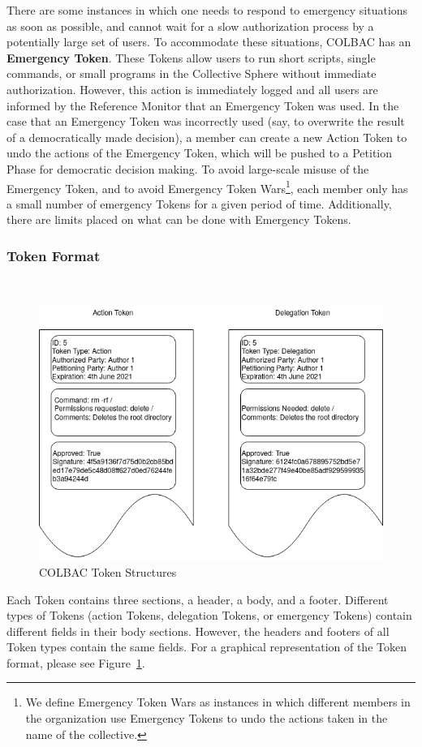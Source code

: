 There are some instances in which one needs to respond to emergency situations
as soon as possible, and cannot wait for a slow authorization process by a
potentially large set of users. To accommodate these situations, COLBAC has an
\textbf{Emergency Token}. These Tokens allow users to run short scripts, single
commands, or small programs in the Collective Sphere without immediate
authorization. However, this action is immediately logged and all users are
informed by the Reference Monitor that an Emergency Token was used. In the case
that an Emergency Token was incorrectly used (say, to overwrite the result of
a democratically made decision), a member can create a new Action Token to
undo the actions of the Emergency Token, which will be pushed to a Petition
Phase for democratic decision making. To avoid large-scale misuse of the
Emergency Token, and to avoid Emergency Token Wars\footnote{We define Emergency
Token Wars as instances in which different members in the organization use
Emergency Tokens to undo the actions taken in the name of the collective.},
each member only has a small number of emergency Tokens for a given period of
time. Additionally, there are limits placed on what can be done with Emergency
Tokens.

\subsubsection{Token Format}
\label{sec:Tokenformat}
\mbox{}\\
\begin{figure}
\includegraphics[width=\linewidth]{figs/TokenStructures.png}
\caption{COLBAC Token Structures}
\label{fig:Tokenformatfigure}
\end{figure}
Each Token contains three sections, a header, a body, and a footer. Different
types of Tokens (action Tokens, delegation Tokens, or emergency Tokens) contain
different fields in their body sections. However, the headers and footers of all
Token types contain the same fields. For a graphical representation of the Token
format, please see Figure~\ref{fig:Tokenformatfigure}.

